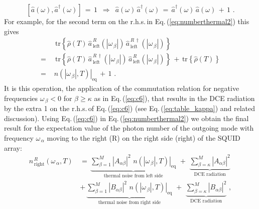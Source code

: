 %
\begin{equation} \label{c5}
\left[ \hat{a}(\omega), \hat{a}^{\dagger}(\omega) \right] \, = \, 1 \, \, \, \Rightarrow \, \, \, 
\hat{a}(\omega) \, \hat{a}^{\dagger}(\omega) \, = \, \hat{a}^{\dagger}(\omega) \, \hat{a}(\omega) \, + \, 1 \, \, .
\end{equation}
%
For example, for the second term on the r.h.s.\,in Eq.\,(\ref{eq:numberthermal2}) this gives
%
\begin{equation} \label{eq:c6}
\begin{split}
& \, \, \, \text{tr} \left\{ \hat{\rho}(T) \,
\hat{a}_{\,\text{left}}^{\,R}(|\omega_{\,\beta}|) \, 
\hat{a}_{\,\text{left}}^{\,R\,\dagger}(|\omega_{\,\beta}|) \right\} \\[3mm]
= & \, \, \, \text{tr} \left\{ \hat{\rho}(T) \,
\hat{a}_{\,\text{left}}^{\,R\,\dagger}(|\omega_{\,\beta}|) \, 
\hat{a}_{\,\text{left}}^{\,R}(|\omega_{\,\beta}|) \right\} \, + \, 
\text{tr} \left\{ \hat{\rho}(T) \right\} \\[3mm]
= & \, \, \left. n(|\omega_{\,\beta}|, T) \right|_{\text{eq}} \, + \, 1 \, \, .
\end{split}
\end{equation}
%
It is this operation, the application of the commutation relation for negative frequencies
$\omega_{\,\beta} < 0$ for $\beta \ge \kappa$ as in Eq.\,(\ref{eq:c6}), that results in the DCE 
radiation by the extra 1 on the r.h.s.\,of Eq.\,(\ref{eq:c6}) (see Eq.\,(\ref{eq:table_kappa})
and related discussion).
Using Eq.\,(\ref{eq:c6}) in Eq.\,(\ref{eq:numberthermal2}) we obtain the final result for the
expectation value of the photon number of the outgoing mode with frequency 
$\omega_{\,\alpha}$ moving to the right (R) on the right side (right) of the SQUID array:
%
\begin{equation} \label{eq:dce_right}
\begin{split}
n_{\,\text{right}}^{\,R}(\omega_{\,\alpha}, T) \, & = \,
\underbrace{\sum\limits_{\beta=1}^{M} \left|A_{\alpha \beta}\right|^2 \, \,
\left. n(|\omega_{\,\beta}|, T) \right|_{\text{eq}}}_{\text{thermal noise from left side}}
\, \, + \, \,
\underbrace{\sum\limits_{\beta=\kappa}^{M} \left|A_{\alpha \beta}\right|^2}_{\text{DCE radiation}} \\[4mm]
& + \, \underbrace{\sum\limits_{\beta=1}^{M} \left|B_{\alpha \beta}\right|^2 \, \,
\left. n(|\omega_{\,\beta}|, T) \right|_{\text{eq}}}_{\text{thermal noise from right side}}
\, \, + \, \,
\underbrace{\sum\limits_{\beta=\kappa}^{M} \left|B_{\alpha \beta}\right|^2}_{\text{DCE radiation}} \, \, ,
\end{split}
\end{equation}
